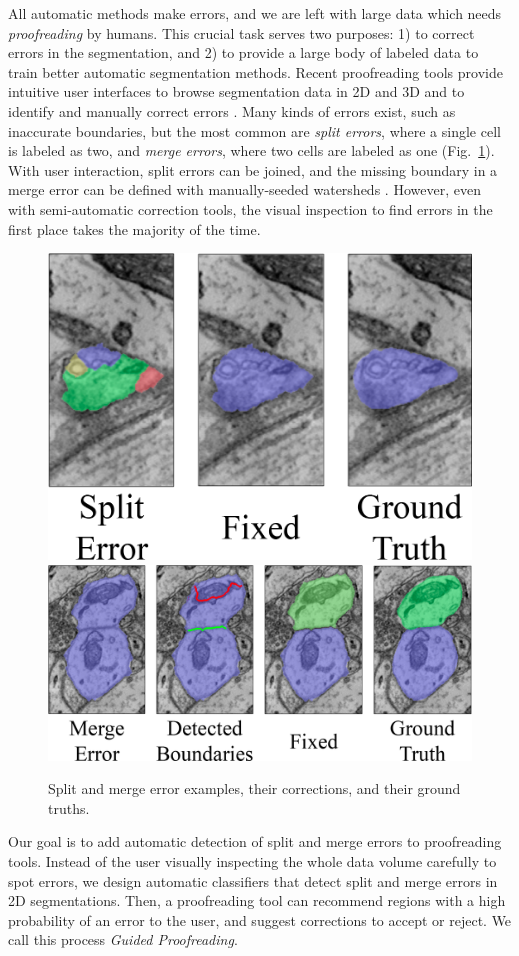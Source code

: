 All automatic methods make errors, and we are left with large data which needs \emph{proofreading} by humans. This crucial task serves two purposes: 1) to correct errors in the segmentation, and 2) to provide a large body of labeled data to train better automatic segmentation methods. Recent proofreading tools provide intuitive user interfaces to browse segmentation data in 2D and 3D and to identify and manually correct errors \cite{markus_proofreading,raveler,mojo2,haehn_dojo_2014,karimov_guided_volume_editing,uzunbas}. Many kinds of errors exist, such as inaccurate boundaries, but the most common are \emph{split errors}, where a single cell is labeled as two, and \emph{merge errors}, where two cells are labeled as one (Fig.~\ref{fig:merge_error}). With user interaction, split errors can be joined, and the missing boundary in a merge error can be defined with manually-seeded watersheds \cite{haehn_dojo_2014}. However, even with semi-automatic correction tools, the visual inspection to find errors in the first place takes the majority of the time.

\begin{figure}[t]
\centering
\includegraphics[width=.35\textwidth]{gfx/spliterror_2.png}
\qquad
\includegraphics[width=.55\textwidth]{gfx/mergeerror.png}
\caption{Split and merge error examples, their corrections, and their ground truths.}
\label{fig:merge_error}
\end{figure}

Our goal is to add automatic detection of split and merge errors to proofreading tools. Instead of the user visually inspecting the whole data volume carefully to spot errors, we design automatic classifiers that detect split and merge errors in 2D segmentations. Then, a proofreading tool can recommend regions with a high probability of an error to the user, and suggest corrections to accept or reject. We call this process \textit{Guided Proofreading}.

